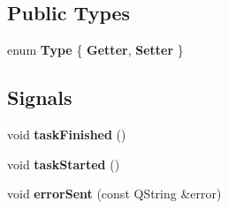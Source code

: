 \subsection*{Public Types}
\begin{DoxyCompactItemize}
\item 
enum {\bfseries Type} \{ {\bfseries Getter}, 
{\bfseries Setter}
 \}\hypertarget{class_p_l_m_task_a9e0f58ff71fe4908bf42d3b9275df359}{}\label{class_p_l_m_task_a9e0f58ff71fe4908bf42d3b9275df359}

\end{DoxyCompactItemize}
\subsection*{Signals}
\begin{DoxyCompactItemize}
\item 
void {\bfseries task\+Finished} ()\hypertarget{class_p_l_m_task_a42d0acbdca59ddb213499193d80d9dcb}{}\label{class_p_l_m_task_a42d0acbdca59ddb213499193d80d9dcb}

\item 
void {\bfseries task\+Started} ()\hypertarget{class_p_l_m_task_a3e4ffc2ec649612a18676de0d3b90cca}{}\label{class_p_l_m_task_a3e4ffc2ec649612a18676de0d3b90cca}

\item 
void {\bfseries error\+Sent} (const Q\+String \&error)\hypertarget{class_p_l_m_task_a6838dfdac49090cffeb26591dc29736d}{}\label{class_p_l_m_task_a6838dfdac49090cffeb26591dc29736d}

\end{DoxyCompactItemize}
